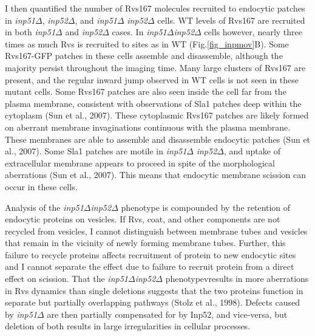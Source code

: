 \vspace{5mm}
I then quantified the number of Rvs167 molecules recruited to endocytic patches in \textit{inp51$\Delta$}, \textit{inp52$\Delta$}, and \textit{inp51$\Delta$} \textit{inp52$\Delta$} cells. WT levels of Rvs167 are recruited in both \textit{inp51$\Delta$} and \textit{inp52$\Delta$} cases. In \textit{inp51$\Delta$}\textit{inp52$\Delta$} cells however, nearly three times as much Rvs is recruited to sites as in WT (Fig.\ref{fig_inpmov}B). Some Rvs167-GFP patches in these cells assemble and disassemble, although the majority persist throughout the imaging time. Many large clusters of Rvs167 are present, and the regular inward jump observed in WT cells is not seen in these mutant cells. Some Rvs167 patches are also seen inside the cell far from the plasma membrane, consistent with observations of Sla1 patches deep within the cytoplasm (Sun et al., 2007). These cytoplasmic Rvs167 patches are likely formed on  aberrant membrane invaginations continuous with the plasma membrane. These membranes are able to assemble and disassemble endocytic patches (Sun et al., 2007). Some Sla1 patches are motile in \textit{inp51$\Delta$} \textit{inp52$\Delta$}, and uptake of extracellular membrane appears to proceed in spite of the morphological aberrations (Sun et al., 2007). This means that endocytic membrane scission can occur in these cells. 



\vspace{5mm}
Analysis of the \textit{inp51$\Delta$}\textit{inp52$\Delta$} phenotype is compounded by the retention of endocytic proteins on vesicles. If Rvs, coat, and other components are not recycled from vesicles, I cannot distinguish between membrane tubes and vesicles that remain in the vicinity of newly forming membrane tubes. Further, this failure to recycle proteins affects recruitment of protein to new endocytic sites and I cannot separate the effect due to failure to recruit protein from a direct effect on scission. That  the \textit{inp51$\Delta$}\textit{inp52$\Delta$} phenotypevresults in more aberrations in Rvs dynamics than single deletions suggests that the two proteins function in separate but partially overlapping pathways (Stolz et al., 1998). Defects caused by \textit{inp51$\Delta$}
are then partially compensated for by Inp52, and vice-versa, but deletion of both results in large irregularities in cellular processes.




